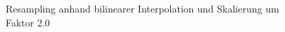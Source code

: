 \documentclass[12pt,german]{article}
\begin{document}

\newpage


\begin{figure}[H]
	\centering
	\caption{Resampling anhand bilinearer Interpolation und Skalierung um Faktor 2.0}
	\label{fig:resultResamplingBilinearInterpolation-2.0}
\end{figure}




\newpage
\end{document}
